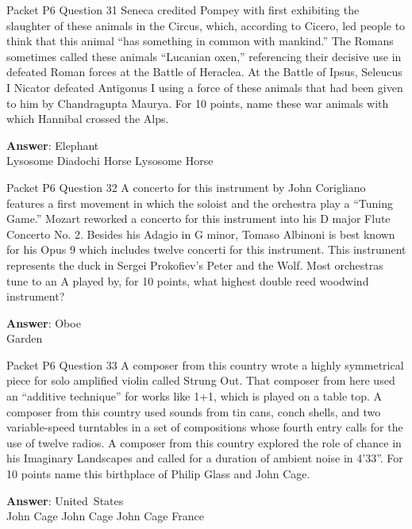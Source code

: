 \begin{frame}{Packet P6 Question 31}
Seneca credited Pompey   with first exhibiting the slaughter of these animals in the Circus, which, according to Cicero, led people to think that this animal “has something in common with mankind.” The Romans sometimes called these animals ``Lucanian oxen,'' referencing   their decisive use in defeated Roman forces at the Battle of Heraclea. At the Battle of Ipsus, Seleucus I Nicator defeated Antigonus I using a force of these animals that had been given to him by Chandragupta Maurya. For 10 points, name   these war animals with which Hannibal crossed the Alps.      

\textbf{Answer}: Elephant\\
 Lysosome
 Diadochi
 Horse
 Lysosome
 Horse
\end{frame}

\begin{frame}{Packet P6 Question 32}
A concerto for this instrument   by John Corigliano features a first movement in which the soloist and the orchestra play a “Tuning Game.” Mozart reworked a concerto for this instrument   into his D major Flute Concerto No. 2.   Besides his Adagio in G minor, Tomaso Albinoni is best known for his Opus 9 which includes twelve concerti for this instrument. This instrument represents the duck in Sergei Prokofiev's   Peter and the Wolf. Most orchestras   tune to an A played by, for 10 points, what highest double reed woodwind instrument?

\textbf{Answer}: Oboe\\
 Garden
\end{frame}

\begin{frame}{Packet P6 Question 33}
A composer from this country wrote a highly symmetrical piece   for solo amplified violin called Strung Out. That composer from here used an ``additive technique'' for works like 1+1, which is played on a table top. A composer from this country used sounds from tin cans, conch shells, and two variable-speed turntables in a set of compositions whose fourth entry calls   for the use of twelve radios. A composer from this country explored the role of chance in his Imaginary Landscapes and called for a duration of ambient noise   in 4'33''. For 10   points name this birthplace of Philip Glass and John Cage.    

\textbf{Answer}: United\ States\\
 John Cage
 John Cage
 John Cage
 France
\end{frame}

